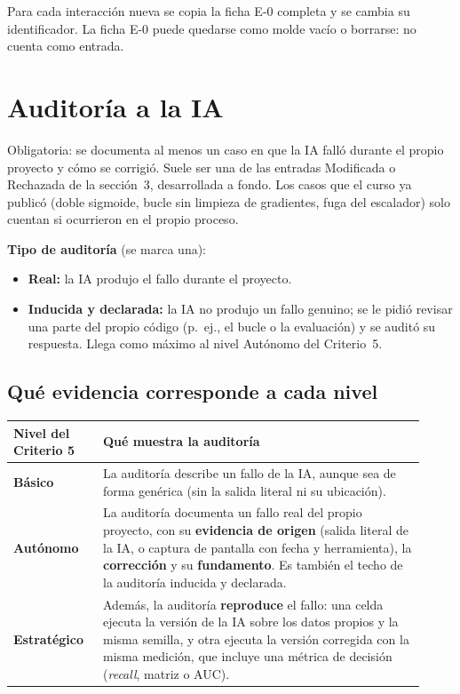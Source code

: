 Para cada interacción nueva se copia la ficha E-0 completa y se cambia su identificador. La ficha E-0 puede quedarse como molde vacío o borrarse: no cuenta como entrada.

\section{Auditoría a la IA}

Obligatoria: se documenta al menos un caso en que la IA falló durante el propio proyecto y cómo se corrigió. Suele ser una de las entradas Modificada o Rechazada de la sección~3, desarrollada a fondo. Los casos que el curso ya publicó (doble sigmoide, bucle sin limpieza de gradientes, fuga del escalador) solo cuentan si ocurrieron en el propio proceso.

\textbf{Tipo de auditoría} (se marca una):

\begin{itemize}[leftmargin=1.8em, label={}]
  \item[\casilla] \textbf{Real:} la IA produjo el fallo durante el proyecto.
  \item[\casilla] \textbf{Inducida y declarada:} la IA no produjo un fallo genuino; se le pidió revisar una parte del propio código (p.~ej., el bucle o la evaluación) y se auditó su respuesta. Llega como máximo al nivel Autónomo del Criterio~5.
\end{itemize}

\subsection*{Qué evidencia corresponde a cada nivel}

{\renewcommand{\arraystretch}{1.3}%
\begin{longtable}{|>{\raggedright\arraybackslash\bfseries}p{0.20\linewidth}
                  |>{\raggedright\arraybackslash}p{0.72\linewidth}|}
\hline
\rowcolor{ustamorado!10}\textbf{Nivel del Criterio 5} & \textbf{Qué muestra la auditoría} \\ \hline
\endhead
Básico & La auditoría describe un fallo de la IA, aunque sea de forma genérica (sin la salida literal ni su ubicación). \\ \hline
Autónomo & La auditoría documenta un fallo real del propio proyecto, con su \textbf{evidencia de origen} (salida literal de la IA, o captura de pantalla con fecha y herramienta), la \textbf{corrección} y su \textbf{fundamento}. Es también el techo de la auditoría inducida y declarada. \\ \hline
Estratégico & Además, la auditoría \textbf{reproduce} el fallo: una celda ejecuta la versión de la IA sobre los datos propios y la misma semilla, y otra ejecuta la versión corregida con la misma medición, que incluye una métrica de decisión (\textit{recall}, matriz o AUC). \\ \hline
\end{longtable}}

